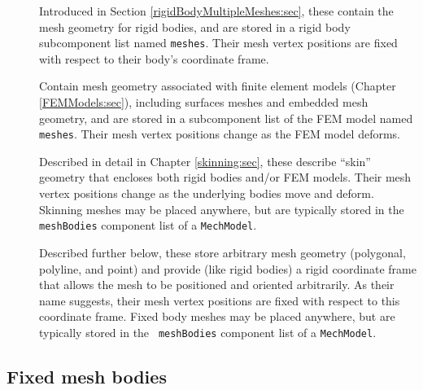 \begin{description}

\item[]\mbox{}

Introduced in Section \ref{rigidBodyMultipleMeshes:sec}, these contain
the mesh geometry for rigid bodies, and are stored in a rigid body
subcomponent list named {\tt meshes}. Their mesh vertex positions
are fixed with respect to their body's coordinate frame.

\item[]\mbox{}

Contain mesh geometry associated with finite element models (Chapter
\ref{FEMModels:sec}), including surfaces meshes and embedded mesh
geometry, and are stored in a subcomponent list of the FEM model
named {\tt meshes}. Their mesh vertex positions change as the FEM model
deforms.

\item[]\mbox{}

Described in detail in Chapter \ref{skinning:sec}, these describe
``skin'' geometry that encloses both rigid bodies and/or FEM models.
Their mesh vertex positions change as the underlying bodies move and
deform. Skinning meshes may be placed anywhere, but are typically
stored in the {\tt meshBodies} component list of a {\tt MechModel}.

\item[]\mbox{}

Described further below, these store arbitrary mesh geometry
(polygonal, polyline, and point) and provide (like rigid bodies) a
rigid coordinate frame that allows the mesh to be positioned and
oriented arbitrarily. As their name suggests, their mesh vertex
positions are fixed with respect to this coordinate frame. Fixed body
meshes may be placed anywhere, but are typically stored in the {\tt
meshBodies} component list of a {\tt MechModel}.

\end{description}

\subsection{Fixed mesh bodies}
\label{FixedMeshBodies:sec}

